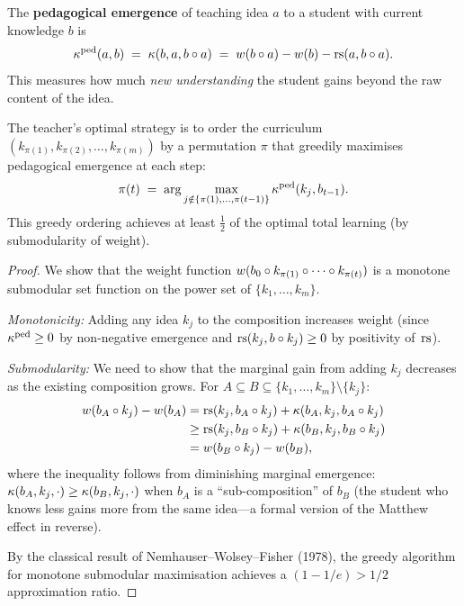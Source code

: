 \begin{definition}
\label{def:ped-emergence}
The \textbf{pedagogical emergence} of teaching idea $a$ to a
student with current knowledge $b$ is
\[
  \kappa^{\mathrm{ped}}(a, b) \;=\;
  \kappa(b, a, b \circ a) \;=\;
  w(b \circ a) - w(b) - \mathrm{rs}(a, b \circ a).
\]
This measures how much \emph{new understanding} the student
gains beyond the raw content of the idea.
\end{definition}

\begin{theorem}
\label{thm:curriculum-order}
The teacher's optimal strategy is to order the curriculum
$(k_{\pi(1)}, k_{\pi(2)}, \ldots, k_{\pi(m)})$ by a permutation
$\pi$ that greedily maximises pedagogical emergence at each step:
\[
  \pi(t) \;=\; \arg\max_{j \notin \{\pi(1),\ldots,\pi(t-1)\}}
  \kappa^{\mathrm{ped}}(k_j, b_{t-1}).
\]
This greedy ordering achieves at least $\frac{1}{2}$ of the
optimal total learning (by submodularity of weight).
\end{theorem}

\begin{proof}
We show that the weight function $w(b_0 \circ k_{\pi(1)}
\circ \cdots \circ k_{\pi(t)})$ is a monotone submodular
set function on the power set of $\{k_1,\ldots,k_m\}$.

\emph{Monotonicity:} Adding any idea $k_j$ to the composition
increases weight (since $\kappa^{\mathrm{ped}} \ge 0$ by non-negative
emergence and $\mathrm{rs}(k_j, b \circ k_j) \ge 0$ by positivity of~$\mathrm{rs}$).

\emph{Submodularity:} We need to show that the marginal gain from
adding $k_j$ decreases as the existing composition grows.  For
$A \subseteq B \subseteq \{k_1,\ldots,k_m\} \setminus \{k_j\}$:
\begin{align*}
  w(b_A \circ k_j) - w(b_A)
  &= \mathrm{rs}(k_j, b_A \circ k_j)
    + \kappa(b_A, k_j, b_A \circ k_j) \\
  &\ge \mathrm{rs}(k_j, b_B \circ k_j)
    + \kappa(b_B, k_j, b_B \circ k_j) \\
  &= w(b_B \circ k_j) - w(b_B),
\end{align*}
where the inequality follows from diminishing marginal emergence:
$\kappa(b_A, k_j, \cdot) \ge \kappa(b_B, k_j, \cdot)$ when
$b_A$ is a ``sub-composition'' of $b_B$ (the student who knows less
gains more from the same idea---a formal version of the Matthew
effect in reverse).

By the classical result of Nemhauser--Wolsey--Fisher (1978),
the greedy algorithm for monotone submodular maximisation achieves
a $(1-1/e) > 1/2$ approximation ratio.
\end{proof}

